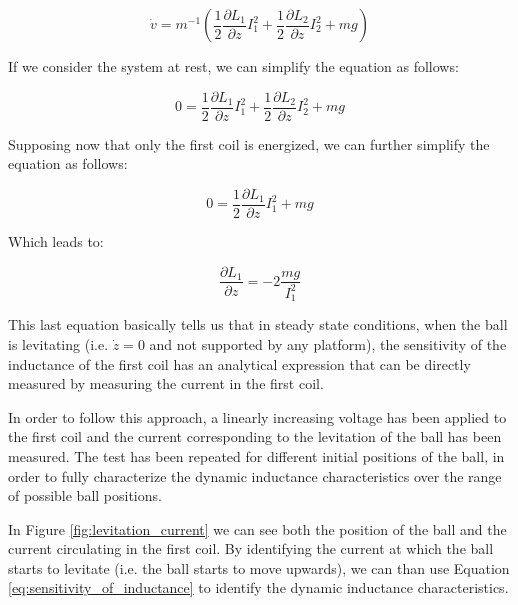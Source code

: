 \begin{equation}
    \dot{v} = m^{-1} \left(\frac{1}{2} \frac{\partial L_1}{\partial z} I_1^2 + \frac{1}{2} \frac{\partial L_2}{\partial z} I_2^2 + m g  \right)
\end{equation}

If we consider the system at rest, we can simplify the equation as follows:

\begin{equation}
    0 = \frac{1}{2} \frac{\partial L_1}{\partial z} I_1^2 + \frac{1}{2} \frac{\partial L_2}{\partial z} I_2^2 + m g
\end{equation}

Supposing now that only the first coil is energized, we can further simplify the equation as follows:

\begin{equation}
    0 = \frac{1}{2} \frac{\partial L_1}{\partial z} I_1^2 + m g
\end{equation}

Which leads to:

\begin{equation}
    \frac{\partial L_1}{\partial z} = -2 \frac{m g}{I_1^2}
    \label{eq:sensitivity_of_inductance}
\end{equation}

This last equation basically tells us that in steady state conditions, when the ball is levitating (i.e. $\dot{z} = 0$ and not supported by any platform), the sensitivity of the inductance of the first coil has an analytical expression that can be directly measured by measuring the current in the first coil.

In order to follow this approach, a linearly increasing voltage has been applied to the first coil and the current corresponding to the levitation of the ball has been measured.
The test has been repeated for different initial positions of the ball, in order to fully characterize the dynamic inductance characteristics over the range of possible ball positions.

In Figure \ref{fig:levitation_current} we can see both the position of the ball and the current circulating in the first coil.
By identifying the current at which the ball starts to levitate (i.e. the ball starts to move upwards), we can than use Equation \ref{eq:sensitivity_of_inductance} to identify the dynamic inductance characteristics.

